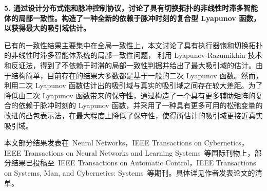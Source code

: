 \textbf{5. 通过设计分布式饱和脉冲控制协议，讨论了具有切换拓扑的非线性时滞多智能体的局部一致性。构造了一种全新的依赖于脉冲时刻的复合型 Lyapunov 函数，以获得最大的吸引域估计。}

已有的一致性结果主要集中在全局一致性上，本文讨论了具有执行器饱和切换拓扑的非线性时滞多智能体系统的局部一致性问题，
利用 Lyapunov-Razumikhin 技术和反证法，得到了不依赖于时滞的局部一致性判据并给出了最大吸引域的估计。由于结构简单，目前存在的结果大多数都是基于一般的二次  Lyapunov 函数。然而，利用二次 Lyapunov 函数估计出的吸引域与真实的吸引域之间存在较大差距。为了降低由二次 Lyapunov 函数带来的保守性，通过构造了一个具有更多辅助矩阵的复合的依赖于脉冲时刻的 Lyapunov 函数，并采用了一种具有更多可用的松弛变量的改进的凸包表示法，在最大程度上降低了保守性，使得所估计的吸引域更接近真实吸引域。 

 

本文部分结果发表在~Neural Networks，IEEE Transactions on Cybernetics，IEEE Transactions on Neural Networks and Learning Systems~等国际刊物上，部分结果已投稿至~IEEE
Transactions on Automatic Control，IEEE Transactions on Systems, Man, and Cybernetics: Systems~等期刊。具体详见作者发表论文的清单。
